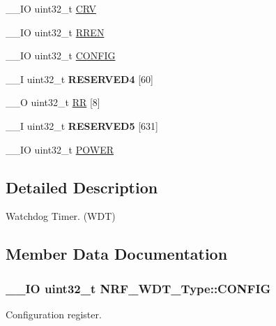 \begin{DoxyCompactItemize}
\item 
\+\_\+\+\_\+\+I\+O uint32\+\_\+t \hyperlink{struct_n_r_f___w_d_t___type_a7c10e34d5cbb958ddde18be79ea00e67}{C\+R\+V}
\item 
\+\_\+\+\_\+\+I\+O uint32\+\_\+t \hyperlink{struct_n_r_f___w_d_t___type_a83ed2d3f3e28bdf63741bf896f2be3c3}{R\+R\+E\+N}
\item 
\+\_\+\+\_\+\+I\+O uint32\+\_\+t \hyperlink{struct_n_r_f___w_d_t___type_a6bd107c91d65a40173d89fa9c36b3b49}{C\+O\+N\+F\+I\+G}
\item 
\hypertarget{struct_n_r_f___w_d_t___type_a909dc3a742b9078bab520737aa0a02f7}{}\+\_\+\+\_\+\+I uint32\+\_\+t {\bfseries R\+E\+S\+E\+R\+V\+E\+D4} \mbox{[}60\mbox{]}\label{struct_n_r_f___w_d_t___type_a909dc3a742b9078bab520737aa0a02f7}

\item 
\+\_\+\+\_\+\+O uint32\+\_\+t \hyperlink{struct_n_r_f___w_d_t___type_a0d565e6ecd319bf5f2f10f12cba329d2}{R\+R} \mbox{[}8\mbox{]}
\item 
\hypertarget{struct_n_r_f___w_d_t___type_addcf8e329bfbed5a2086c8b278206567}{}\+\_\+\+\_\+\+I uint32\+\_\+t {\bfseries R\+E\+S\+E\+R\+V\+E\+D5} \mbox{[}631\mbox{]}\label{struct_n_r_f___w_d_t___type_addcf8e329bfbed5a2086c8b278206567}

\item 
\+\_\+\+\_\+\+I\+O uint32\+\_\+t \hyperlink{struct_n_r_f___w_d_t___type_a47df9029a71b38c0678fa609ba1c22aa}{P\+O\+W\+E\+R}
\end{DoxyCompactItemize}


\subsection{Detailed Description}
Watchdog Timer. (W\+D\+T) 

\subsection{Member Data Documentation}
\hypertarget{struct_n_r_f___w_d_t___type_a6bd107c91d65a40173d89fa9c36b3b49}{}
\subsubsection[{C\+O\+N\+F\+I\+G}]{\setlength{\rightskip}{0pt plus 5cm}\+\_\+\+\_\+\+I\+O uint32\+\_\+t N\+R\+F\+\_\+\+W\+D\+T\+\_\+\+Type\+::\+C\+O\+N\+F\+I\+G}\label{struct_n_r_f___w_d_t___type_a6bd107c91d65a40173d89fa9c36b3b49}
Configuration register. \hypertarget{struct_n_r_f___w_d_t___type_a7c10e34d5cbb958ddde18be79ea00e67}{}
